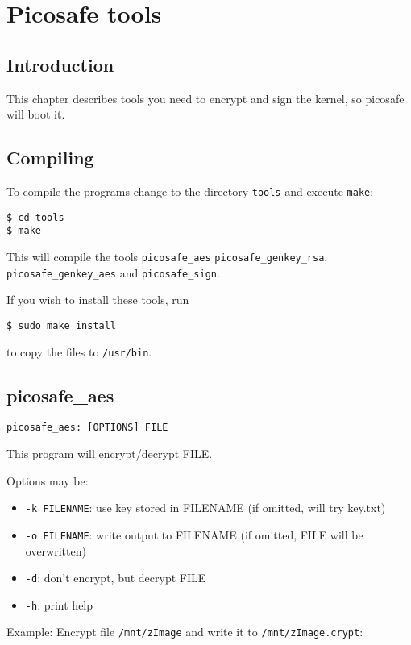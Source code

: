 \chapter{Picosafe tools}
\label{tools}

\section{Introduction}

This chapter describes tools you need to encrypt and sign the kernel, so
picosafe will boot it.

\section{Compiling}

To compile the programs change to the directory \texttt{tools} and execute \texttt{make}:

\texttt{\$ cd tools} \\
\texttt{\$ make}

This will compile the tools \texttt{picosafe\_aes} \texttt{picosafe\_genkey\_rsa},
\texttt{picosafe\_genkey\_aes} and \texttt{picosafe\_sign}.

If you wish to install these tools, run

\texttt{\$ sudo make install}

to copy the files to \texttt{/usr/bin}.

\section{picosafe\_aes}
\label{picosafe_aes}

\texttt{picosafe\_aes: [OPTIONS] FILE}

This program will encrypt/decrypt FILE.

Options may be:
\begin{itemize}
\item \texttt{-k FILENAME}: use key stored in FILENAME (if omitted, will try key.txt)
\item \texttt{-o FILENAME}: write output to FILENAME (if omitted, FILE will be overwritten)
\item \texttt{-d}: don't encrypt, but decrypt FILE
\item \texttt{-h}: print help
\end{itemize}

Example: Encrypt file \texttt{/mnt/zImage} and write it to \texttt{/mnt/zImage.crypt}:

